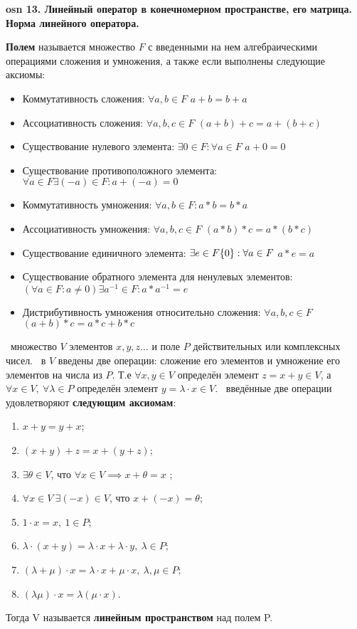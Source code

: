 \textbf{\LARGE osn 13. Линейный оператор в конечномерном пространстве, его матрица. Норма линейного оператора.}


\textbf{Полем} называется множество $F$ с введенными на нем алгебраическими операциями сложения и умножения, а также если выполнены следующие аксиомы:
\begin{itemize}
    \item Коммутативность сложения: $\forall a,b \in F$ $a + b = b + a$
    \item Ассоциативность сложения: $\forall a,b,c \in F$ $(a + b) + c = a + (b + c)$
    \item Существование нулевого элемента: $\exists 0 \in F: \forall a \in F$ $a + 0 = 0$
    \item Существование противоположного элемента: $\forall a \in F \exists (-a) \in F: a + (-a) = 0$
    \item Коммутативность умножения: $\forall a, b \in F: a * b = b * a$
    \item Ассоциативность умножения: $\forall a,b,c \in F$ $(a * b) * c = a * (b * c)$
    \item Существование единичного элемента: $\exists e \in F\\ \{0\}: \forall a \in F$ $a * e = a$ 
    \item Существование обратного элемента для ненулевых элементов: $ (\forall a \in F: a \neq 0) \exists a^{-1} \in F: a * a^{-1} = e$
    \item Дистрибутивность умножения относительно сложения: $\forall a,b,c \in F$ $(a + b) *c = a * c + b * c$
\end{itemize}


\faEye \ множество $V$ элементов $x, y, z\dots$ и поле $P$ действительных или комплексных чисел. \mathLet \ в $V$ введены две операции: сложение его элементов и умножение его элементов на числа из $P$. 
Т.е $\forall x,y \in V$ определён элемент $z = x+y \in V$, а $\forall x \in V, ~ \forall \lambda \in P$ определён элемент $y = \lambda \cdot x \in  V$. \mathLet \ введённые две операции удовлетворяют \textbf{следующим аксиомам}:
\begin{enumerate}
    \item $x+y=y+x$;
    \item $(x+y)+z=x+(y+z)$;
    \item $\exists \theta\in V$, что $\forall x\in V \implies x+\theta=x$ ;
    \item $\forall x \in V ~ \exists (-x) \in V$, что $x + (-x) = \theta$;
    \item $1 \cdot x = x,~1 \in P$;
    \item $\lambda \cdot(x+y)=\lambda \cdot x+\lambda \cdot y,~\lambda \in P$;
    \item $(\lambda +\mu)\cdot x=\lambda \cdot x+\mu \cdot x,~\lambda,\mu \in P$;
    \item $(\lambda \mu )\cdot x = \lambda (\mu \cdot x)$.
\end{enumerate}
Тогда V называется \textbf{линейным пространством} над полем P.

